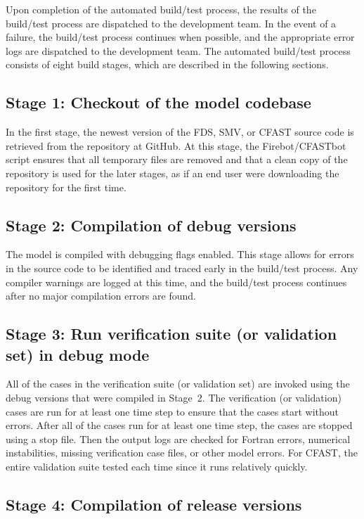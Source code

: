 \documentclass[11pt]{book}
\begin{document}
Upon completion of the automated build/test process, the results of the build/test process are dispatched to the development team. In the event of a failure, the build/test process continues when possible, and the appropriate error logs are dispatched to the development team. The automated build/test process consists of eight build stages, which are described in the following sections.

\subsection*{Stage 1: Checkout of the model codebase}

In the first stage, the newest version of the FDS, SMV, or CFAST source code is retrieved from the repository at GitHub. At this stage, the Firebot/CFASTbot script ensures that all temporary files are removed and that a clean copy of the repository is used for the later stages, as if an end user were downloading the repository for the first time.

\subsection*{Stage 2: Compilation of debug versions}

The model is compiled with debugging flags enabled. This stage allows for errors in the source code to be identified and traced early in the build/test process. Any compiler warnings are logged at this time, and the build/test process continues after no major compilation errors are found.

\subsection*{Stage 3: Run verification suite (or validation set) in debug mode}

All of the cases in the verification suite (or validation set) are invoked using the debug versions that were compiled in Stage~2. The verification (or validation) cases are run for at least one time step to ensure that the cases start without errors. After all of the cases run for at least one time step, the cases are stopped using a stop file. Then the output logs are checked for Fortran errors, numerical instabilities, missing verification case files, or other model errors. For CFAST, the entire validation suite tested each time since it runs relatively quickly.

\subsection*{Stage 4: Compilation of release versions}
\end{document}
